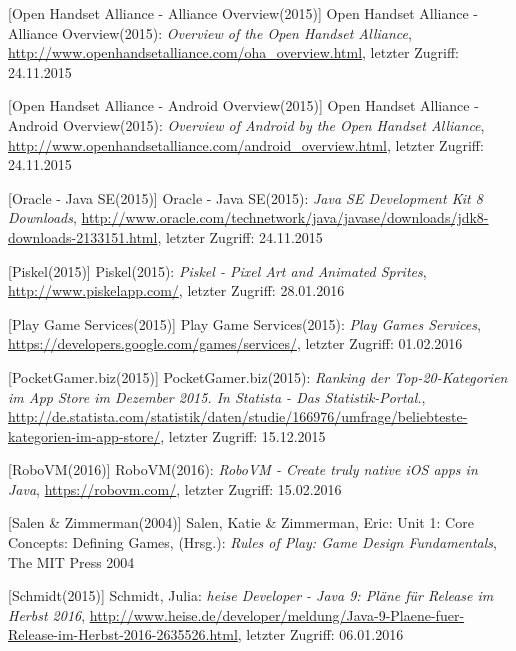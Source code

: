 \begin{thebibliography}{}
[Open Handset Alliance - Alliance Overview(2015)] Open Handset Alliance - Alliance Overview(2015): \emph{Overview of the Open Handset Alliance},
\url{http://www.openhandsetalliance.com/oha_overview.html}, letzter Zugriff: 24.11.2015

[Open Handset Alliance - Android Overview(2015)] Open Handset Alliance - Android Overview(2015): \emph{Overview of Android by the Open Handset Alliance},
\url{http://www.openhandsetalliance.com/android_overview.html}, letzter Zugriff: 24.11.2015

[Oracle - Java SE(2015)] Oracle - Java SE(2015): \emph{Java SE Development Kit 8 Downloads},
\url{http://www.oracle.com/technetwork/java/javase/downloads/jdk8-downloads-2133151.html}, letzter Zugriff: 24.11.2015

[Piskel(2015)] Piskel(2015): \emph{Piskel - Pixel Art and Animated Sprites},
\url{http://www.piskelapp.com/}, letzter Zugriff: 28.01.2016

[Play Game Services(2015)] Play Game Services(2015): \emph{Play Games Services},
\url{https://developers.google.com/games/services/}, letzter Zugriff: 01.02.2016

[PocketGamer.biz(2015)] PocketGamer.biz(2015): \emph{Ranking der Top-20-Kategorien im App Store im Dezember 2015. In Statista - Das Statistik-Portal.},
\url{http://de.statista.com/statistik/daten/studie/166976/umfrage/beliebteste-kategorien-im-app-store/}, letzter Zugriff: 15.12.2015

[RoboVM(2016)] RoboVM(2016): \emph{RoboVM - Create truly native iOS apps in Java},
\url{https://robovm.com/}, letzter Zugriff: 15.02.2016

[Salen \& Zimmerman(2004)] Salen, Katie \& Zimmerman, Eric: 
\glqq Unit 1: Core Concepts: Defining Games\grqq, 
(Hrsg.): \emph{Rules of Play: Game Design Fundamentals}, The MIT Press 2004

[Schmidt(2015)] Schmidt, Julia: \emph{heise Developer - Java 9: Pläne für Release im Herbst 2016},
\url{http://www.heise.de/developer/meldung/Java-9-Plaene-fuer-Release-im-Herbst-2016-2635526.html}, letzter Zugriff: 06.01.2016


\end{thebibliography}
